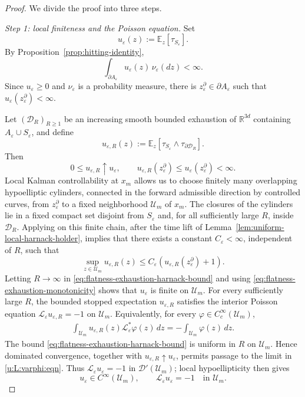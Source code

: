 \documentclass[11pt]{article}
\numberwithin{equation}{section}
\theoremstyle{plain}
\theoremstyle{definition}
\theoremstyle{remark}
\newcommand{\R}{\mathbb R}
\newcommand{\eps}{\varepsilon}
\newcommand{\E}{\mathbb E}
\newcommand{\calL}{\mathcal L}
\begin{document}
\begin{proof}
We divide the proof into three steps.

\emph{Step 1: local finiteness and the Poisson equation.}
Set
\[
u_\eps(z):=\E_z[\tau_{S_\eps}].
\]
By Proposition~\ref{prop:hitting-identity},
\begin{equation}
\label{eq:flatness-finite-boundary-average}
\int_{\partial A_\eps}u_\eps(z)\,\nu_\eps(dz)<\infty.
\end{equation}
Since $u_\eps\ge0$ and $\nu_\eps$ is a probability measure, there is
$z_\eps^\partial\in\partial A_\eps$ such that
$u_\eps(z_\eps^\partial)<\infty$.

Let $(\mathscr D_R)_{R\ge1}$ be an increasing smooth bounded exhaustion of
$\R^{3d}$ containing $A_\eps\cup S_\eps$, and define
\[
u_{\eps,R}(z)
:=\E_z\left[\tau_{S_\eps}\wedge\tau_{\partial\mathscr D_R}\right].
\]
Then
\begin{equation}
\label{eq:flatness-exhaustion-monotonicity}
0\le u_{\eps,R}\uparrow u_\eps,
\qquad
u_{\eps,R}\left(z_\eps^\partial\right)
\le u_\eps\left(z_\eps^\partial\right)<\infty.
\end{equation}
Local Kalman controllability at $x_m$ allows us to choose finitely many
overlapping hypoelliptic cylinders, connected in the forward admissible
direction by controlled curves, from $z_\eps^\partial$ to a fixed
neighborhood $\mathscr U_m$ of $x_m$.  The closures of the cylinders lie in a
fixed compact set disjoint from $S_\eps$ and, for all sufficiently large $R$,
inside $\mathscr D_R$.  Applying
\cite[Proposition~7.1 and Theorem~7.1]{Bony1969} on this finite chain, after
the time lift of Lemma~\ref{lem:uniform-local-harnack-holder}, implies that there exists a constant
$C_\eps<\infty$, independent of $R$, such that
\begin{equation}
\label{eq:flatness-exhaustion-harnack-bound}
\sup_{z\in\mathscr U_m}u_{\eps,R}(z)
\le C_\eps\left(u_{\eps,R}\left(z_\eps^\partial\right)+1\right).
\end{equation}
Letting $R\to\infty$ in
\eqref{eq:flatness-exhaustion-harnack-bound} and using
\eqref{eq:flatness-exhaustion-monotonicity} shows that $u_\eps$ is finite on
$\mathscr U_m$.  For every sufficiently large $R$, the bounded stopped
expectation $u_{\eps,R}$ satisfies the interior Poisson equation
$\calL_\eps u_{\eps,R}=-1$ on $\mathscr U_m$.  Equivalently, for every
$\varphi\in C_c^\infty(\mathscr U_m)$,
\begin{align}\label{u:L:varphi:eqn}
\int_{\mathscr U_m}u_{\eps,R}(z)\calL_\eps^*\varphi(z)\,dz
=-\int_{\mathscr U_m}\varphi(z)\,dz.
\end{align}
The bound \eqref{eq:flatness-exhaustion-harnack-bound} is uniform in $R$ on
$\mathscr U_m$.  Hence dominated convergence, together with
$u_{\eps,R}\uparrow u_\eps$, permits passage to the limit in \eqref{u:L:varphi:eqn}.  Thus $\calL_\eps u_\eps=-1$ in
$\mathcal D'(\mathscr U_m)$; local hypoellipticity then
gives
\begin{equation}
\label{eq:flatness-local-poisson-equation}
u_\eps\in C^\infty(\mathscr U_m),
\qquad
\calL_\eps u_\eps=-1\quad\text{in }\mathscr U_m.
\end{equation}


\end{proof}
\end{document}
